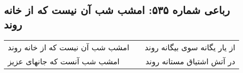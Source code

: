 \begin{center}
\section*{رباعی شماره ۵۳۵: امشب شب آن نیست که از خانه روند}
\label{sec:0535}
\begin{longtable}{l p{0.5cm} r}
امشب شب آن نیست که از خانه روند
&&
از یار یگانه سوی بیگانه روند
\\
امشب شب آنست که جانهای عزیز
&&
در آتش اشتیاق مستانه روند
\\
\end{longtable}
\end{center}
